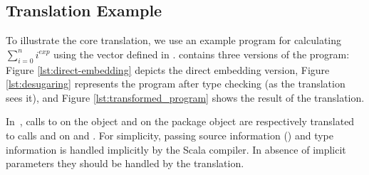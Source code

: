 
\subsection{Translation Example}
\label{sec:translation-example}

To illustrate the core translation, we use an example program for calculating $\sum_{i=0}^n i^{exp}$ using the vector \edsl defined in .  contains three versions of the program: Figure \ref{lst:direct-embedding} depicts the direct embedding version, Figure \ref{lst:desugaring} represents the program after type checking (as the translation sees it), and Figure \ref{lst:transformed_program} shows the result of the translation.

 In~, calls to  on the object
  and  on the package object 
 are respectively translated to calls  and  on
  and . For simplicity, passing source
 information () and type information  is
 handled implicitly by the Scala compiler. In absence of implicit parameters
 they should be handled by the translation.

